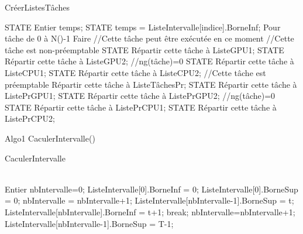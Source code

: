 \begin{algorithm}[H]
\caption{CréerListesTâches}
\label{algo3}
\begin{algorithmic}[1]
\LOOP
	STATE Entier temps;
	STATE temps = ListeIntervalle[indice].BorneInf;
	Pour tâche de 0 à N()-1 Faire
		 //Cette	tâche peut être exécutée en ce moment
				//Cette tâche est non-préemptable
						STATE Répartir cette tâche à ListeGPU1;
					\ELSE
						STATE Répartir cette tâche à ListeGPU2;
					\ENDIF
				\ELSE	//ng(tâche)=0
						STATE Répartir cette tâche à ListeCPU1;
					\ELSE
						STATE Répartir cette tâche à ListeCPU2;
					\ENDIF
				\ENDIF
			\ELSE	//Cette tâche est préemptable
				Répartir cette tâche à ListeTâchesPr;
						STATE Répartir cette tâche à ListePrGPU1;
					\ELSE
						STATE Répartir cette tâche à ListePrGPU2;
					\ENDIF
				\ELSE	//ng(tâche)=0
						STATE Répartir cette tâche à ListePrCPU1;
					\ELSE
						STATE Répartir cette tâche à ListePrCPU2;
					\ENDIF
				\ENDIF
			\ENDIF
	\ENDFOR
\ENDLOOP
\end{algorithmic}
\end{algorithm} 

Algo1 CaculerIntervalle()
\begin{algorithm}[H]
\caption{CaculerIntervalle}
\label{algo1}
\begin{algorithmic}[1]
\\
\LOOP
\STATE Entier nbIntervalle=0;
\STATE ListeIntervalle[0].BorneInf = 0;
\STATE ListeIntervalle[0].BorneSup = 0;
				\STATE nbIntervalle = nbIntervalle+1;
				\STATE ListeIntervalle[nbIntervalle-1].BorneSup = t;
				\STATE ListeIntervalle[nbIntervalle].BorneInf = t+1; 
				\STATE break;
			\ENDIF
		\ENDFOR
	\ENDFOR
	\STATE nbIntervalle=nbIntervalle+1;
	\STATE ListeIntervalle[nbIntervalle-1].BorneSup = T-1;
\ENDLOOP
\end{algorithmic}
\end{algorithm}

